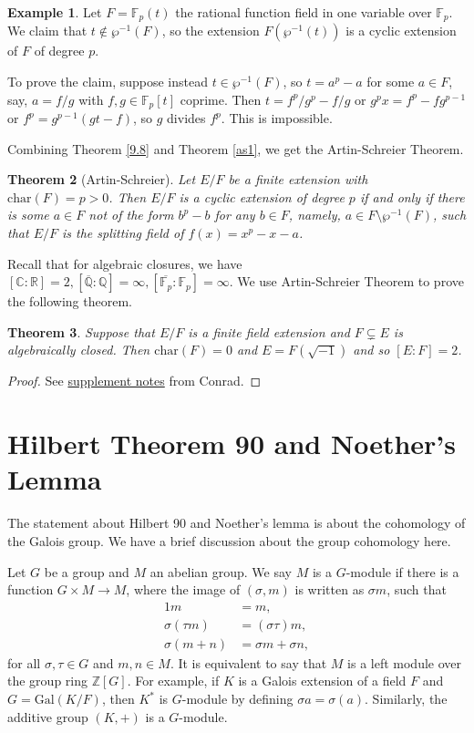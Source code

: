 \documentclass[12pt]{report}
\newtheorem{theorem}{Theorem}[section]
\theoremstyle{definition}
\newtheorem{example}[theorem]{Example}
\newcommand{\cc}{\mathbb{C}}
\newcommand{\ff}{\mathbb{F}}
\newcommand{\qq}{\mathbb{Q}}
\newcommand{\charr}{\text{char}}
\newcommand{\Gal}{\text{Gal}}
\newcommand{\gm}{$G$-module}
\newcommand{\ZZ}{\mathbb{Z}}
\newcommand{\RR}{\mathbb{R}}
\newcommand{\FF}{\mathbb{F}}
\begin{document}
\begin{example}
	Let $F=\FF_p(t)$ the rational function field in one variable over $\FF_p$. We claim that $t\notin \wp^{-1}(F)$, so the extension $F(\wp^{-1}(t))$ is a cyclic extension of $F$ of degree $p$.

	To prove the claim, suppose instead $t\in \wp^{-1}(F)$, so $t=a^p-a$ for some $a\in F$, say, $a=f/g$ with $f,g\in \FF_p[t]$ coprime. Then $t=f^p/g^p-f/g$ or $g^px=f^p-fg^{p-1}$ or $f^p=g^{p-1}(gt-f)$, so $g$ divides $f^p$. This is impossible.
\end{example}

\noindent Combining Theorem \ref{9.8} and Theorem \ref{as1}, we get the Artin-Schreier Theorem.

\begin{theorem}[Artin-Schreier]
	Let $E/F$ be a finite extension with $\charr(F)=p>0$. Then $E/F$ is a cyclic extension of degree $p$ if and only if there is some $a\in F$ not of the form $b^p-b$ for any $b\in F$, namely, $a\in F\setminus \wp^{-1}(F)$, such that $E/F$ is the splitting field of $f(x)=x^p-x-a$.
\end{theorem}

Recall that for algebraic closures, we have $[\cc:\RR]=2, [\overline{\qq}:\qq]=\infty, [\overline{\ff_p}:\ff_p]=\infty$. We use Artin-Schreier Theorem to prove the following theorem.

\begin{theorem}
	Suppose that $E/F$ is a finite field extension and $F\subsetneq E$ is algebraically closed. Then $\charr(F)=0$ and $E=F(\sqrt{-1})$ and so $[E:F]=2$.
\end{theorem}

\begin{proof}
	See \href{https://kconrad.math.uconn.edu/blurbs/galoistheory/artinschreier.pdf}{supplement notes} from Conrad.
\end{proof}

\section{Hilbert Theorem 90 and Noether's Lemma}

The statement about Hilbert 90 and Noether's lemma is about the cohomology of the Galois group. We have a brief discussion about the group cohomology here.

Let $G$ be a group and $M$ an abelian group. We say $M$ is a $G$-module if there is a function $G\times M\to M$, where the image of $(\sigma,m)$ is written as $\sigma m$, such that \begin{align*}
	1m             & = m,                 \\
	\sigma(\tau m) & =(\sigma\tau)m,      \\
	\sigma(m+n)    & =\sigma m +\sigma n,
\end{align*}
for all $\sigma,\tau\in G$ and $m,n\in M$. It is equivalent to say that $M$ is a left module over the group ring $\ZZ[G]$. For example, if $K$ is a Galois extension of a field $F$ and $G=\Gal(K/F)$, then $K^*$ is $G$-module by defining $\sigma a=\sigma(a)$. Similarly, the additive group $(K,+)$ is a \gm.
\end{document}
